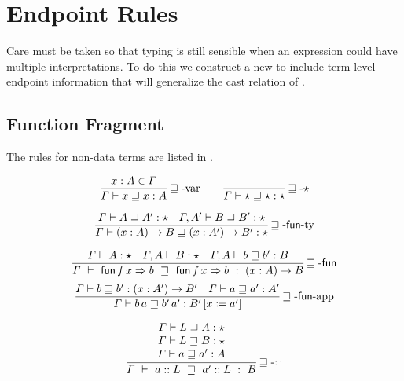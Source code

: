 \section{Endpoint Rules}

Care must be taken so that typing is still sensible when an expression could have multiple interpretations.
To do this we construct a new \csys{} to include term level endpoint information that will generalize the cast relation of .

\subsection{Function Fragment}
The rules for non-data terms are listed in .

\begin{figure}

\begin{align*}
 \frac{x:A\in\varGamma}{\varGamma\vdash x\sqsupseteq x:A}\rulename{\sqsupseteq-var}
  \quad & \quad 
  \frac{\ }{\varGamma\vdash\star\sqsupseteq\star:\star}\rulename{\sqsupseteq-\star}
  \\
\end{align*}

\[
\frac{
\varGamma\vdash A\sqsupseteq A':\star \quad
\varGamma,A'\vdash B\sqsupseteq B':\star
}{
  \varGamma\vdash\left(x:A\right)\rightarrow B\sqsupseteq\left(x:A'\right)\rightarrow B':\star
}\operatorname{\sqsupseteq-\mathsf{fun}-ty}
\]

\[
\frac{
\varGamma\vdash A:\star\quad\varGamma,A\vdash B:\star \quad
\varGamma,A\vdash b\sqsupseteq b':B
}{
  \varGamma\ \vdash\ \mathsf{fun}\,f\,x\Rightarrow b\ \sqsupseteq\ \mathsf{fun}\,f\,x\Rightarrow b\ :\ \left(x:A\right)\rightarrow B
}\rulename{\sqsupseteq-\mathsf{fun}}
\]
\[
\frac{
\varGamma\vdash b\sqsupseteq b':\left(x:A'\right)\rightarrow B' \quad
\varGamma\vdash a\sqsupseteq a':A'
}{
  \varGamma\vdash b\,a\sqsupseteq b'\,a':B'\left[x\coloneqq a'\right]
}\operatorname{\sqsupseteq-\mathsf{fun}-app}
\]

\[
\frac{\begin{array}{c}
  \varGamma\vdash L\sqsupseteq A:\star\\
  \varGamma\vdash L\sqsupseteq B:\star\\
  \varGamma\vdash a\sqsupseteq a':A
  \end{array}}{\varGamma\ \vdash\ a::L\ \sqsupseteq\ a'::L\ :\ B}\rulename{\sqsupseteq-::}
\]


\end{figure}
